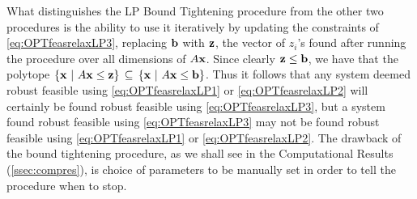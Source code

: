 What distinguishes the LP Bound Tightening procedure from the other two procedures is the ability to use it iteratively by updating the constraints of \cref{eq:OPTfeasrelaxLP3}, replacing $\mathbf{b}$ with $\mathbf{z}$, the vector of $z_i$'s found after running the procedure over all dimensions of $A\mathbf{x}$. 
Since clearly $\mathbf{z} \leq \mathbf{b}$, we have that the polytope $\{\mathbf{x} ~|~ A\mathbf{x}\leq \mathbf{z}\} \, \subseteq \, \{\mathbf{x} ~|~ A\mathbf{x}\leq \mathbf{b}\}$. 
Thus it follows that any system deemed robust feasible using \cref{eq:OPTfeasrelaxLP1} or \cref{eq:OPTfeasrelaxLP2} will certainly be found robust feasible using \cref{eq:OPTfeasrelaxLP3}, but a system found robust feasible using \cref{eq:OPTfeasrelaxLP3} may not be found robust feasible using \cref{eq:OPTfeasrelaxLP1} or \cref{eq:OPTfeasrelaxLP2}. 
The drawback of the bound tightening procedure, as we shall see in the Computational Results (\cref{ssec:compres}), is choice of parameters to be manually set in order to tell the procedure when to stop. 

